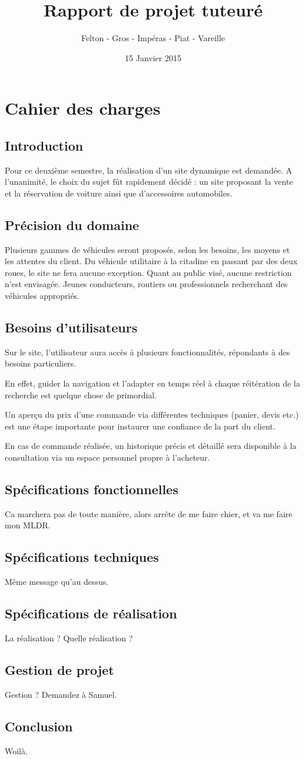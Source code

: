 \documentclass[a4paper]{article}
\title{\Huge \textbf{Rapport de projet tuteuré}}
\author{\Large Felton - Gros - Impéras - Piat - Vareille}
\date{15 Janvier 2015}
\begin{document}
\maketitle
\newpage

\tableofcontents
\newpage

\section{Cahier des charges}
	\subsection*{Introduction}
	
	Pour ce deuxième semestre, la réalisation d'un site dynamique est demandée. A l'unanimité, le choix du sujet fût rapidement décidé : un site proposant la vente et la réservation de voiture ainsi que d'accessoires automobiles.
	\subsection{Précision du domaine}
	
	Plusieurs gammes de véhicules seront proposés, selon les besoins, les moyens et les attentes du client. Du véhicule utilitaire à la citadine en passant par des deux roues, le site ne fera aucune exception. Quant au public visé, aucune restriction n'est envisagée. Jeunes conducteurs, routiers ou professionnels recherchant des véhicules appropriés.
	\subsection{Besoins d'utilisateurs}
	Sur le site, l'utilisateur aura accès à plusieurs fonctionnalités, répondants à des besoins particuliers.
	
	En effet, guider la navigation et l'adapter en temps réel à chaque réitération de la recherche est quelque chose de primordial. 
	
	Un aperçu du prix d'une commande via différentes techniques (panier, devis etc.) est une étape importante pour instaurer une confiance de la part du client.
	
	En cas de commande réalisée, un historique précis et détaillé sera disponible à la consultation via un espace personnel propre à l'acheteur.  
	\subsection{Spécifications fonctionnelles}
	Ca marchera pas de toute manière, alors arrête de me faire chier, et va me faire mon MLDR.
	\subsection{Spécifications techniques}
	Même message qu'au dessus.
	\subsection{Spécifications de réalisation}
	La réalisation ? Quelle réalisation ?
	\subsection{Gestion de projet}
	Gestion ? Demandez à Samuel.
	\subsection*{Conclusion}
	Woilà.
\end{document}
